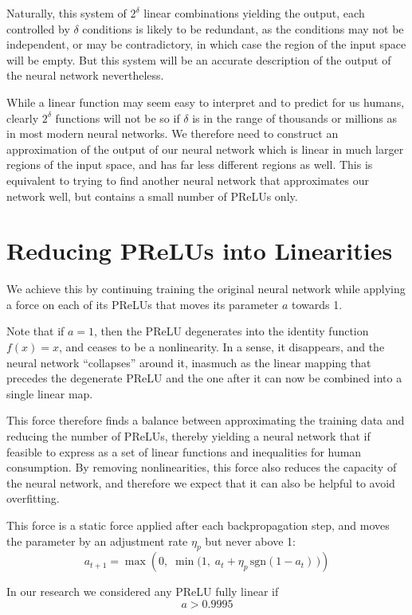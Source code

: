 \documentclass{article}[12pt]
\begin{document}
Naturally, this system of $2^\delta$ linear combinations yielding the output, each controlled by $\delta$
conditions is likely to be redundant, as the conditions may not be independent,
or may be contradictory, in which case the region of the input space will be empty.
But this system will be an accurate description of the output of the neural network nevertheless.

\bigskip

\noindent
While a linear function may seem easy to interpret and to predict for us humans, clearly $2^\delta$
functions will not be so if $\delta$ is in the range of thousands or millions as in most modern neural networks.
We therefore need to construct an approximation of the output of our neural network which is linear in much
larger regions of the input space, and has far less different regions as well.
This is equivalent to trying to find another neural network that approximates our network well,
but contains a small number of PReLUs only.

\section{Reducing PReLUs into Linearities}

We achieve this by continuing training the original neural network while applying a force on each of
its PReLUs that moves its parameter $a$ towards 1.

Note that if $a=1$, then the PReLU degenerates into the identity function $f(x)=x$, and ceases to be a nonlinearity.
In a sense, it disappears, and the neural network ``collapses'' around it, inasmuch as the linear mapping
that precedes the degenerate PReLU and the one after it can now be combined into a single linear map.

This force therefore finds a balance between approximating the training data
and reducing the number of PReLUs, thereby yielding a neural network that if feasible to express
as a set of linear functions and inequalities for human consumption.
By removing nonlinearities, this force also reduces the capacity of the neural network,
and therefore we expect that it can also be helpful to avoid overfitting.

This force is a static force applied after each backpropagation step, and moves the parameter by an adjustment rate
$\eta_p$ but never above 1:
\[ a_{t+1} = \max\left(0,\;\min\big(1,\;a_t + \eta_p\,\mathrm{sgn}(1-a_t)\,\big)\right) \]

In our research we considered any PReLU fully linear if
\[ a > 0.9995 \]
\end{document}
